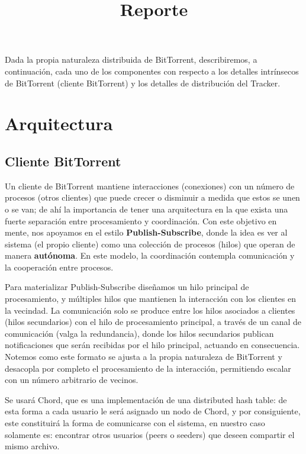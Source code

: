 \documentclass{article}
\title{Reporte}
\author{}
\date{}
\begin{document}
\maketitle

Dada la propia naturaleza distribuida de BitTorrent, describiremos, a continuación, cada uno de los componentes con respecto a los detalles intrínsecos de BitTorrent (cliente BitTorrent) y los detalles de distribución del Tracker.

\section{Arquitectura}

\subsection{Cliente BitTorrent}

Un cliente de BitTorrent mantiene interacciones (conexiones) con un número de procesos (otros clientes) que puede crecer o disminuir a medida que estos se unen o se van; de ahí la importancia de tener una arquitectura en la que exista una fuerte separación entre procesamiento y coordinación. Con este objetivo en mente, nos apoyamos en el estilo \textbf{Publish-Subscribe}, donde la idea es ver al sistema (el propio cliente) como una colección de procesos (hilos) que operan de manera \textbf{autónoma}. En este modelo, la coordinación contempla comunicación y la cooperación entre procesos.

Para materializar Publish-Subscribe diseñamos un hilo principal de procesamiento, y múltiples hilos que mantienen la interacción con los clientes en la vecindad. La comunicación solo se produce entre los hilos asociados a clientes (hilos secundarios) con el hilo de procesamiento principal, a través de un canal de comunicación (valga la redundancia), donde los hilos secundarios publican notificaciones que serán recibidas por el hilo principal, actuando en consecuencia. Notemos como este formato se ajusta a la propia naturaleza de BitTorrent y desacopla por completo el procesamiento de la interacción, permitiendo escalar con un número arbitrario de vecinos.

Se usará Chord, que es una implementación de una distributed hash table: de esta forma a cada usuario le será asignado un nodo de Chord, y por consiguiente, este constituirá la forma de comunicarse con el sistema, en nuestro caso solamente es: encontrar otros usuarios (peers o seeders) que deseen compartir el mismo archivo.
\end{document}

